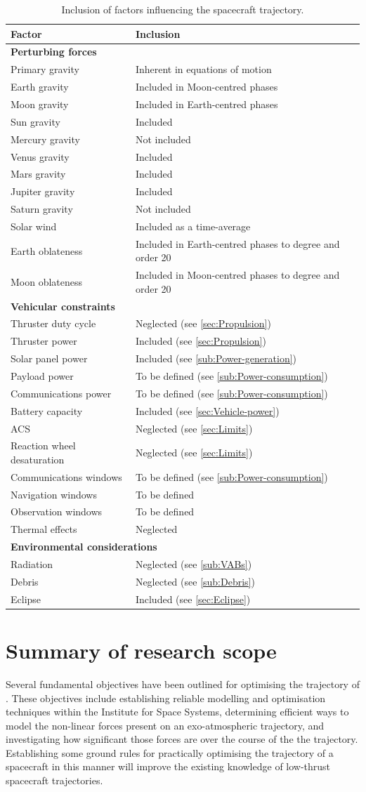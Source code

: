 \begin{table}
\centering
\caption{Inclusion of factors influencing the spacecraft trajectory.} \label{tab:Scope-limitations}
\begin{tabular}{p{} p{}} \toprule
Factor & Inclusion \tabularnewline\midrule
\textbf{Perturbing forces} \tabularnewline
Primary gravity & Inherent in equations of motion \tabularnewline
Earth gravity & Included in Moon-centred phases \tabularnewline
Moon gravity & Included in Earth-centred phases \tabularnewline
Sun gravity & Included \tabularnewline
Mercury gravity & Not included \tabularnewline
Venus gravity & Included \tabularnewline
Mars gravity & Included \tabularnewline
Jupiter gravity & Included \tabularnewline
Saturn gravity & Not included \tabularnewline
Solar wind & Included as a time-average \tabularnewline
Earth oblateness & Included in Earth-centred phases to degree and order 20 \tabularnewline
Moon oblateness & Included in Moon-centred phases to degree and order 20 \tabularnewline\midrule
\textbf{Vehicular constraints} \tabularnewline
Thruster duty cycle & Neglected (see \autoref{sec:Propulsion}) \tabularnewline
Thruster power & Included (see \autoref{sec:Propulsion}) \tabularnewline
Solar panel power & Included (see \autoref{sub:Power-generation}) \tabularnewline
Payload power & To be defined (see \autoref{sub:Power-consumption}) \tabularnewline
Communications power & To be defined (see \autoref{sub:Power-consumption}) \tabularnewline
Battery capacity & Included (see \autoref{sec:Vehicle-power}) \tabularnewline
ACS & Neglected (see \autoref{sec:Limits}) \tabularnewline
Reaction wheel desaturation & Neglected (see \autoref{sec:Limits})\tabularnewline
Communications windows & To be defined (see \autoref{sub:Power-consumption}) \tabularnewline
Navigation windows & To be defined \tabularnewline
Observation windows & To be defined \tabularnewline
Thermal effects & Neglected \tabularnewline\midrule
\multicolumn{2}{l}{\textbf{Environmental considerations}} \tabularnewline
Radiation & Neglected (see \autoref{sub:VABs}) \tabularnewline
Debris & Neglected (see \autoref{sub:Debris}) \tabularnewline
Eclipse & Included (see \autoref{sec:Eclipse}) \tabularnewline
\bottomrule
\end{tabular}
\end{table}

\section{Summary of research scope} \label{sec:Objective-summary}

Several fundamental objectives have been outlined for optimising the trajectory of \BW. These objectives include establishing reliable modelling and optimisation techniques within the Institute for Space Systems, determining efficient ways to model the non-linear forces present on an exo-atmospheric trajectory, and investigating how significant those forces are over the course of the the trajectory. Establishing some ground rules for practically optimising the trajectory of a spacecraft in this manner will improve the existing knowledge of low-thrust spacecraft trajectories.